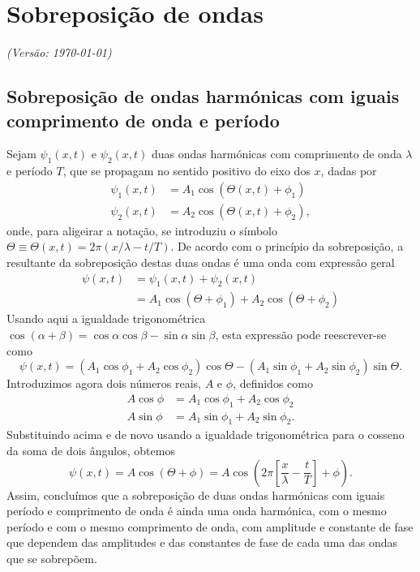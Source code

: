 \chapter{Sobreposição de ondas}
\textsl{{\sffamily(Versão: \today)}}

\section{Sobreposição de ondas harmónicas com iguais comprimento de onda e
período}
\label{sec:sobrpos}
Sejam $\psi_1(x,t)$ e $\psi_2(x,t)$ duas ondas harmónicas com comprimento de
onda $\lambda$ e período $T$, que se propagam no sentido positivo do eixo dos
$x$, dadas por
\begin{align*}
\psi_1(x,t)&=A_1\cos\left(\Theta(x,t)+\phi_1\right)\\
\psi_2(x,t)&=A_2\cos\left(\Theta(x,t)+\phi_2\right),
\end{align*}
onde, para aligeirar a notação, se introduziu o símbolo
$\Theta\equiv\Theta(x,t)=2\pi(x/\lambda-t/T)$. De acordo com o princípio da
sobreposição, a resultante da sobreposição destas duas ondas é uma onda com
expressão geral
\begin{align*}
\psi(x,t)&=\psi_1(x,t)+\psi_2(x,t)\\
&=A_1\cos(\Theta+\phi_1)+A_2\cos(\Theta+\phi_2)
\end{align*}
Usando aqui a igualdade trigonométrica
$\cos(\alpha+\beta)=\cos\alpha\cos\beta-\sin\alpha\sin\beta$, esta expressão
pode reescrever-se como
\begin{equation*}
\psi(x,t)=(A_1\cos\phi_1+A_2\cos\phi_2)\cos\Theta-
(A_1\sin\phi_1+A_2\sin\phi_2)\sin\Theta.
\end{equation*}
Introduzimos agora dois números reais, $A$ e $\phi$, definidos como
\begin{align*}
A\cos\phi&=A_1\cos\phi_1+A_2\cos\phi_2\\
A\sin\phi&=A_1\sin\phi_1+A_2\sin\phi_2.
\end{align*}
Substituindo acima e de novo usando a igualdade trigonométrica para o cosseno da
soma de dois ângulos, obtemos
\begin{equation*}
\psi(x,t)=A\cos\left(\Theta+\phi\right)=
A\cos\left(2\pi\left[\frac{x}{\lambda}-\frac{t}{T}\right]+\phi\right).
\end{equation*}
Assim, concluímos que a sobreposição de duas ondas harmónicas com iguais período
e comprimento de onda é ainda uma onda harmónica, com o mesmo período e com o
mesmo comprimento de onda, com amplitude e constante de fase que dependem das amplitudes
e das constantes de fase de cada uma das ondas que se sobrepõem.

